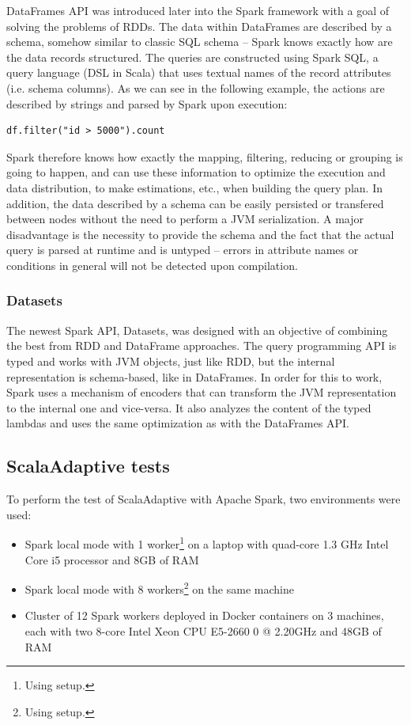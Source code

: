 DataFrames API was introduced later into the Spark framework with a goal of solving the problems of RDDs. The data within DataFrames are described by a schema, somehow similar to classic SQL schema -- Spark knows exactly how are the data records structured. The queries are constructed using Spark SQL, a query language (DSL in Scala) that uses textual names of the record attributes (i.e. schema columns). As we can see in the following example, the actions are described by strings and parsed by Spark upon execution:

\lstset{style=Scala}
\begin{lstlisting}
df.filter("id > 5000").count
\end{lstlisting}

Spark therefore knows how exactly the mapping, filtering, reducing or grouping is going to happen, and can use these information to optimize the execution and data distribution, to make estimations, etc., when building the query plan. In addition, the data described by a schema can be easily persisted or transfered between nodes without the need to perform a JVM serialization. A major disadvantage is the necessity to provide the schema and the fact that the actual query is parsed at runtime and is untyped -- errors in attribute names or conditions in general will not be detected upon compilation.

\subsubsection{Datasets}

The newest Spark API, Datasets, was designed with an objective of combining the best from RDD and DataFrame approaches. The query programming API is typed and works with JVM objects, just like RDD, but the internal representation is schema-based, like in DataFrames. In order for this to work, Spark uses a mechanism of encoders that can transform the JVM representation to the internal one and vice-versa. It also analyzes the content of the typed lambdas and uses the same optimization as with the DataFrames API.

\subsection{ScalaAdaptive tests}

To perform the test of ScalaAdaptive with Apache Spark, two environments were used:

\begin{itemize}
	\item Spark local mode with 1 worker\footnote{Using  setup.} on a laptop with quad-core 1.3 GHz Intel Core i5 processor and 8GB of RAM
	\item Spark local mode with 8 workers\footnote{Using  setup.} on the same machine
	\item Cluster of 12 Spark workers deployed in Docker containers on 3 machines, each with two 8-core Intel Xeon CPU E5-2660 0 @ 2.20GHz and 48GB of RAM
\end{itemize}

